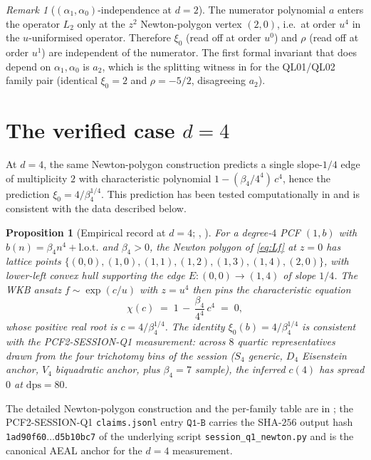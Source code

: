 \documentclass[11pt,reqno]{amsart}
\theoremstyle{plain}
\newtheorem{proposition}[theorem]{Proposition}
\theoremstyle{definition}
\theoremstyle{remark}
\newtheorem{remark}[theorem]{Remark}
\newcommand{\dps}{\mathrm{dps}}
\begin{document}
\begin{remark}[$(\alpha_1, \alpha_0)$-independence at $d = 2$]
\label{rem:numerator-indep}
The numerator polynomial $a$ enters the operator $L_2$ only
at the $z^2$ Newton-polygon vertex $(2,0)$, i.e.\ at order
$u^4$ in the $u$-uniformised operator. Therefore $\xi_0$
(read off at order $u^0$) and $\rho$ (read off at order
$u^1$) are independent of the numerator. The first formal
invariant that does depend on $\alpha_1, \alpha_0$ is $a_2$,
which is the splitting witness in
\cite[Prop.~3.3.B]{siarc_channel_theory_v13} for the
QL01/QL02 family pair (identical $\xi_0 = 2$ and $\rho = -5/2$,
disagreeing $a_2$).
\end{remark}

\section{The verified case \texorpdfstring{$d = 4$}{d=4}}
\label{sec:d4}

At $d = 4$, the same Newton-polygon construction predicts a
single slope-$1/4$ edge of multiplicity $2$ with
characteristic polynomial $1 - (\beta_4/4^4)\,c^4$, hence
the prediction $\xi_0 = 4/\beta_4^{1/4}$. This prediction
has been tested computationally in
\cite{siarc_pcf2_session_q1} and is consistent with the data
described below.

\begin{proposition}[Empirical record at $d = 4$;
{\cite[Prop.~3.3.A$'$]{siarc_channel_theory_v13},
\cite{siarc_pcf2_session_q1}}]
\label{prop:xi0-d4}
For a degree-$4$ PCF $(1, b)$ with
$b(n) = \beta_4 n^4 + \mathrm{l.o.t.}$ and $\beta_4 > 0$,
the Newton polygon of \eqref{eq:Lf} at $z = 0$ has lattice
points
$\{(0,0),(1,0),(1,1),(1,2),(1,3),(1,4),(2,0)\}$, with
lower-left convex hull supporting the edge
$E:(0,0) \to (1,4)$ of slope $1/4$. The WKB ansatz
$f \sim \exp(c/u)$ with $z = u^4$ then pins the
characteristic equation
\[
  \chi(c) \;=\; 1 \,-\, \frac{\beta_4}{4^4}\,c^4 \;=\; 0,
\]
whose positive real root is $c = 4/\beta_4^{1/4}$. The
identity $\xi_0(b) = 4/\beta_4^{1/4}$ is consistent with
the PCF2-SESSION-Q1 measurement: across $8$ quartic
representatives drawn from the four trichotomy bins of
the session ($S_4$ generic, $D_4$ Eisenstein anchor,
$V_4$ biquadratic anchor, plus $\beta_4 = 7$ sample), the
inferred $c(4)$ has spread $0$ at $\dps = 80$.
\end{proposition}

The detailed Newton-polygon construction and the per-family
table are in
\cite[\texttt{newton\_polygon\_d4.tex}]{siarc_pcf2_session_q1};
the PCF2-SESSION-Q1 \texttt{claims.jsonl} entry
$\texttt{Q1-B}$ carries the SHA-$256$ output hash
\texttt{1ad90f60$\dots$d5b10bc7} of the underlying script
\texttt{session\_q1\_newton.py} and is the canonical AEAL
anchor for the $d = 4$ measurement.
\end{document}

